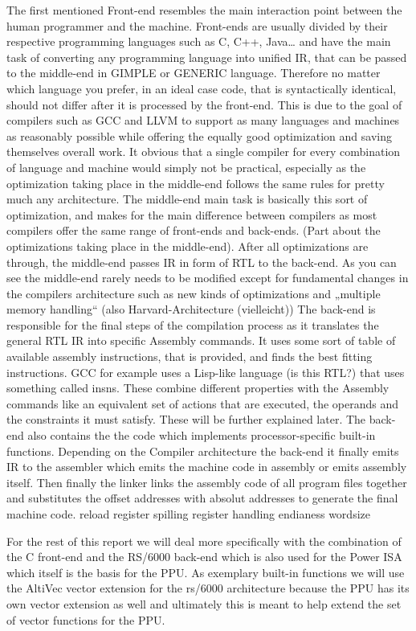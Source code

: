 The first mentioned Front-end resembles the main interaction point between the human programmer and the machine. Front-ends are usually divided by their respective programming languages such as C, C++, Java…  and have the main task of converting any programming language into unified IR, that can be passed to the middle-end in GIMPLE or GENERIC language. Therefore no matter which language you prefer, in an ideal case code, that is syntactically identical, should not differ after it is processed by the front-end. This is due to the goal of compilers such as GCC and LLVM to support as many languages and machines as reasonably possible while offering the equally good optimization and saving themselves overall work. It obvious that a single compiler for every combination of language and machine would simply not be practical, especially as the optimization taking place in the middle-end follows the same rules for pretty much any architecture.
The middle-end main task is basically this sort of optimization, and makes for the main difference between compilers as most compilers offer the same range of front-ends and back-ends. (Part about the optimizations taking place in the middle-end). After all optimizations are through, the middle-end passes IR in form of RTL to the back-end. As you can see the middle-end rarely needs to be modified except for fundamental changes in the compilers architecture such as new kinds of optimizations and „multiple memory handling“ (also Harvard-Architecture (vielleicht))
The back-end is responsible for the final steps of the compilation process as it translates the general RTL IR into specific Assembly commands. It uses some sort of table of available assembly instructions, that is provided, and finds the best fitting instructions. GCC for example uses a Lisp-like language (is this RTL?) that uses something called insns. These combine different properties with the  Assembly commands like an equivalent set of actions that are executed, the  operands and the constraints it must satisfy. These will be further explained later. The back-end also contains the the code which implements processor-specific built-in functions.
Depending on the Compiler architecture the back-end it finally emits IR to the assembler which emits the machine code in assembly or emits assembly itself. Then finally the linker links the assembly code of all program files together and substitutes the offset addresses with absolut addresses to generate the final machine code.
reload
register spilling
register handling
endianess
wordsize

For the rest of this report we will deal more specifically with the combination of the C front-end and the RS/6000 back-end which is also used for the Power ISA which itself is the basis for the PPU. As exemplary built-in functions we will use the AltiVec vector extension for the rs/6000 architecture because the PPU has its own vector extension as well and ultimately this is meant to help extend the set of vector functions for the PPU.
